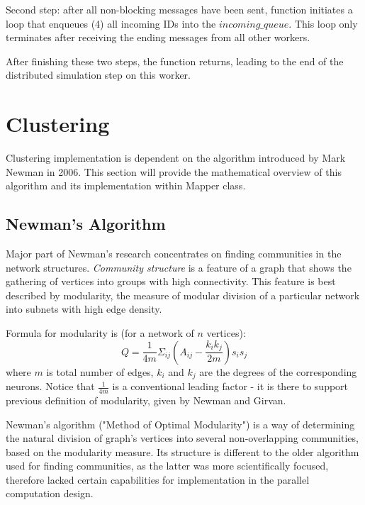 Second step: after all non-blocking messages have been sent, function initiates a loop that enqueues (4) all incoming IDs into the $incoming\_queue$. This loop only terminates after receiving the ending messages from all other workers.

After finishing these two steps, the function returns, leading to the end of the distributed simulation step on this worker.

\section{Clustering}

Clustering implementation is dependent on the algorithm introduced by Mark Newman in 2006. This section will provide the mathematical overview of this algorithm and its implementation within Mapper class.

\subsection{Newman's Algorithm}

Major part of Newman's research concentrates on finding communities in the network structures\cite{NewmanComm}. \emph{Community structure} is a feature of a graph that shows the gathering of vertices into groups with high connectivity. This feature is best described by modularity, the measure of modular division of a particular network into subnets with high edge density.

Formula for modularity is (for a network of $n$ vertices):
\begin{equation}Q = \frac{1}{4m}\Sigma_{ij}(A_{ij} - \frac{k_{i}k_{j}}{2m})s_{i}s_{j}\end{equation}\cite{Newman2006}
where $m$ is total number of edges, $k_{i}$ and $k_{j}$ are the degrees of the corresponding neurons. Notice that $\frac{1}{4m}$ is a conventional leading factor - it is there to support previous definition of modularity, given by Newman and Girvan\cite{Newman2004}.

Newman's algorithm ("Method of Optimal Modularity"\cite{Newman2006}) is a way of determining the natural division of graph's vertices into several non-overlapping communities, based on the modularity measure. Its structure is different to the older algorithm used for finding communities\cite{NewmanAlgo}, as the latter was more scientifically focused, therefore lacked certain capabilities for implementation in the parallel computation design.

